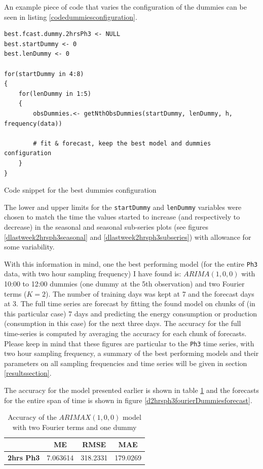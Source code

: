 \documentclass[12pt,a4paper,titlepage]{report}
\begin{document}
An example piece of code that varies the configuration of the dummies can be seen in listing \ref{codedummiesconfiguration}.

\begin{listing}[h]
    \begin{verbatim}
best.fcast.dummy.2hrsPh3 <- NULL
best.startDummy <- 0
best.lenDummy <- 0
    
for(startDummy in 4:8)
{
    for(lenDummy in 1:5)
    {
        obsDummies.<- getNthObsDummies(startDummy, lenDummy, h, frequency(data))
        
        # fit & forecast, keep the best model and dummies configuration
    }
}
\end{verbatim}

\caption{Code snippet for the best dummies configuration}
\label{codedummiesconfiguration}
\end{listing}

The lower and upper limits for the \texttt{startDummy} and \texttt{lenDummy} variables were chosen to match the time the values started to increase (and respectively to decrease) in the seasonal and seasonal sub-series plots (see figures \ref{dlastweek2hrsph3seasonal} and \ref{dlastweek2hrsph3subseries}) with allowance for some variability.

With this information in mind, one the best performing model (for the entire \texttt{Ph3} data, with two hour sampling frequency) I have found is: $ ARIMA(1, 0, 0) $ with 10:00 to 12:00 dummies (one dummy at the 5th observation) and two Fourier terms ($ K = 2 $). The number of training days was kept at 7 and the forecast days at 3. The full time series are forecast by fitting the found model on chunks of (in this particular case) 7 days and predicting the energy consumption or production (consumption in this case) for the next three days. The accuracy for the full time-series is computed by averaging the accuracy for each chunk of forecasts. Please keep in mind that these figures are particular to the \texttt{Ph3} time series, with two hour sampling frequency, a summary of the best performing models and their parameters on all sampling frequencies and time series will be given in section \ref{resultssection}.

The accuracy for the model presented earlier is shown in table \ref{accuracyoffull2hrsph3} and the forecasts for the entire span of time is shown in figure \ref{d2hrsph3fourierDummiesforecast}.

\begin{table}[h]
    \begin{tabular}{|c|c|c|c|}
        \hline
        & \textbf{ME} & \textbf{RMSE} & \textbf{MAE}\\
        \hline
        \textbf{2hrs Ph3} & 7.063614 &	318.2331 &	179.0269 \\
        \hline
    \end{tabular}
    \centering
    \caption{Accuracy of the $ ARIMAX(1, 0, 0) $ model with two Fourier terms and one dummy}
    \label{accuracyoffull2hrsph3}
\end{table}
    
\end{document}
